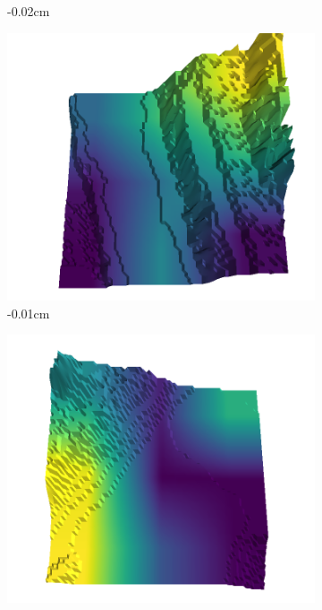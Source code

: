 \documentclass[../document.tex]{subfiles}
\begin{document}
\begin{figure}[H]
\begin{subfigure}[b]{0.242\linewidth}
    \caption{-0.02cm}
    \end{subfigure}
    \begin{subfigure}[b]{0.242\linewidth}
    \includegraphics[width=\linewidth]{../img/5/quarry/worst/10-patch-3d-majavi-colormap-80.png}
    \caption{-0.01cm}
    \end{subfigure}
    \begin{subfigure}[b]{0.242\linewidth}
    \includegraphics[width=\linewidth]{../img/5/quarry/worst/12-patch-3d-majavi-colormap-85.png}

\end{subfigure}
\end{figure}
\end{document}
